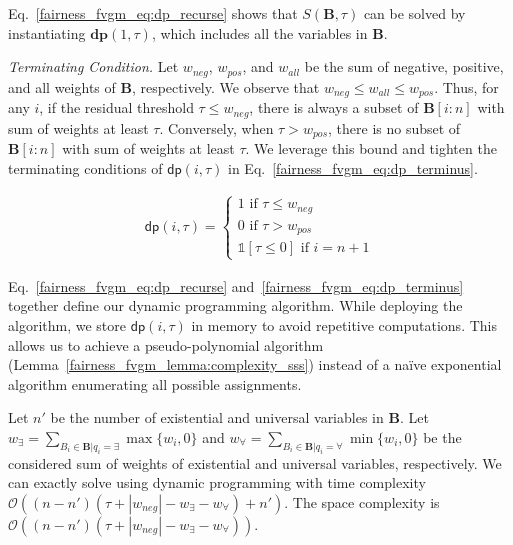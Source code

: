 Eq.~\eqref{fairness_fvgm_eq:dp_recurse} shows that $ S(\mathbf{B},\tau) $ can be solved by instantiating $ \mathbf{dp}(1, \tau) $, which includes all the variables in $ \mathbf{B} $. 

\textit{Terminating Condition.} %
Let $ w_{neg} $, $ w_{pos} $, and $ w_{all} $ be the sum of negative, positive, and all weights of $ \mathbf{B} $, respectively. We observe that $ w_{neg} \le w_{all} \le w_{pos}$. Thus, for any $ i $, if the {residual} threshold $ \tau \le w_{neg}$, there is always a subset of $ \mathbf{B}[i:n] $ with sum of weights at least $ \tau $. Conversely, when $ \tau > w_{pos}$, there is no subset of $ \mathbf{B}[i:n] $ with sum of weights at least $ \tau $.	We leverage this bound and tighten the terminating conditions of $ \mathsf{dp}(i, \tau) $ in Eq.~\eqref{fairness_fvgm_eq:dp_terminus}. 

\begin{align}\label{fairness_fvgm_eq:dp_terminus}
 \mathsf{dp}(i, \tau) =
 \begin{cases}
 1\text{ if }\tau \le w_{neg}\\
 0\text{ if } \tau > w_{pos}\\
 \mathds{1}[\tau \le 0] \text{ if } i=n + 1
 \end{cases} 
\end{align}

Eq.~\eqref{fairness_fvgm_eq:dp_recurse} and~\eqref{fairness_fvgm_eq:dp_terminus} together define our dynamic programming algorithm. While deploying the algorithm, we store $ \mathsf{dp}(i, \tau) $ in memory to avoid repetitive computations.  This allows us to achieve a pseudo-polynomial algorithm (Lemma~\ref{fairness_fvgm_lemma:complexity_sss}) instead of a na\"ive exponential algorithm enumerating all possible assignments.
 
\begin{lemma}\label{fairness_fvgm_lemma:complexity_sss}
 	Let $ n' $ be the number of existential and universal variables in $ \mathbf{B} $. Let $ w_{\exists} = \sum_{B_i \in \mathbf{B} | q_i = \exists} \max\{w_i, 0\}$  and $ w_{\forall} = \sum_{B_i \in \mathbf{B} | q_i = \forall} \min\{w_i, 0\}$ be the considered sum of weights of existential and universal variables, respectively. We can exactly solve {\stochastic} using dynamic programming with time complexity $ \mathcal{O}((n - n')(\tau + |w_{neg}| - w_{\exists} - w_{\forall}) + n') $. The space complexity is  $ \mathcal{O}((n - n')(\tau + |w_{neg}| - w_{\exists} - w_{\forall})) $.
\end{lemma}
 


